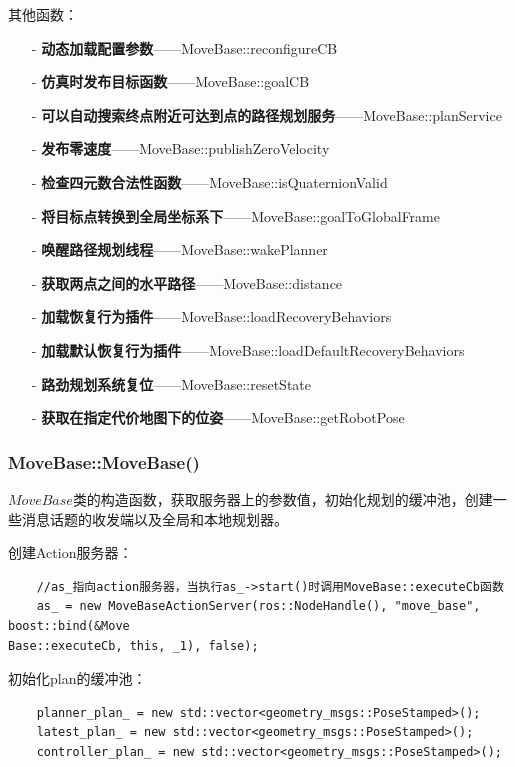 \documentclass[9pt, oneside]{book}
\begin{document}
其他函数：
\begin{itemize}
    \item [-] \textbf{动态加载配置参数}——MoveBase::reconfigureCB
    \item [-] \textbf{仿真时发布目标函数}——MoveBase::goalCB
    \item [-] \textbf{可以自动搜索终点附近可达到点的路径规划服务}——MoveBase::planService
    \item [-] \textbf{发布零速度}——MoveBase::publishZeroVelocity
    \item [-] \textbf{检查四元数合法性函数}——MoveBase::isQuaternionValid
    \item [-] \textbf{将目标点转换到全局坐标系下}——MoveBase::goalToGlobalFrame
    \item [-] \textbf{唤醒路径规划线程}——MoveBase::wakePlanner
    \item [-] \textbf{获取两点之间的水平路径}——MoveBase::distance
    \item [-] \textbf{加载恢复行为插件}——MoveBase::loadRecoveryBehaviors
    \item [-] \textbf{加载默认恢复行为插件}——MoveBase::loadDefaultRecoveryBehaviors
    \item [-] \textbf{路劲规划系统复位}——MoveBase::resetState
    \item [-] \textbf{获取在指定代价地图下的位姿}——MoveBase::getRobotPose
\end{itemize}

\subsubsection{MoveBase::MoveBase()}

$MoveBase$类的构造函数，获取服务器上的参数值，初始化规划的缓冲池，创建一些消息话题的收发端以及全局和本地规划器。

创建Action服务器：

\begin{verbatim}
    //as_指向action服务器，当执行as_->start()时调用MoveBase::executeCb函数
    as_ = new MoveBaseActionServer(ros::NodeHandle(), "move_base", boost::bind(&Move
Base::executeCb, this, _1), false);
\end{verbatim}

初始化plan的缓冲池：

\begin{verbatim}
    planner_plan_ = new std::vector<geometry_msgs::PoseStamped>();
    latest_plan_ = new std::vector<geometry_msgs::PoseStamped>();
    controller_plan_ = new std::vector<geometry_msgs::PoseStamped>();
\end{verbatim}
\end{document}
